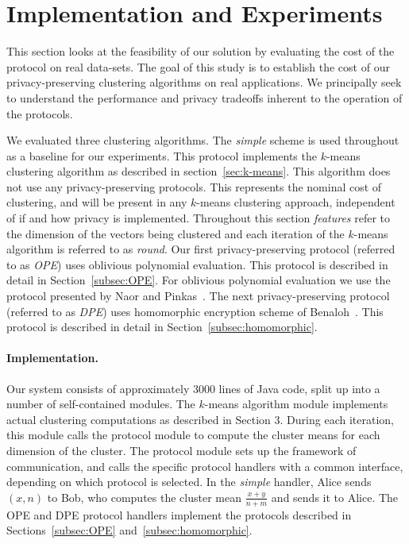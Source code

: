 \section{Implementation and Experiments}
\label{sec:eval}

This section looks at the feasibility of our solution by evaluating
the cost of the protocol on real data-sets.  The goal of this study is
to establish the cost of our privacy-preserving clustering algorithms
on real applications. We principally seek to understand the
performance and privacy tradeoffs inherent to the operation of the
protocols.

We evaluated three clustering algorithms. The {\it simple} scheme is
used throughout as a baseline for our experiments.  This protocol
implements the $k$-means clustering algorithm as described in
section~\ref{sec:k-means}.  This algorithm does not use any
privacy-preserving protocols.  This represents the nominal cost of
clustering, and will be present in any $k$-means clustering approach,
independent of if and how privacy is implemented.  Throughout this
section {\it features} refer to the dimension of the vectors being
clustered and each iteration of the $k$-means algorithm is referred to
as {\it round}.  Our first privacy-preserving protocol (referred to as
{\it OPE}) uses oblivious polynomial evaluation. This protocol is
described in detail in Section~\ref{subsec:OPE}.  For oblivious
polynomial evaluation we use the protocol presented by Naor and
Pinkas~\cite{NaorPinkas99}. The next privacy-preserving protocol
(referred to as {\it DPE}) uses homomorphic encryption scheme of
Benaloh~\cite{Benaloh:94}. This protocol is described in detail in
Section~\ref{subsec:homomorphic}.  

\paragraph{Implementation.}
Our system consists of approximately $3000$ lines of Java code, split
up into a number of self-contained modules.  The $k$-means algorithm
module implements actual clustering computations as described in
Section 3.  During each iteration, this module calls the {\small\sf
protocol} module to compute the cluster means for each dimension of
the cluster.  The {\small\sf protocol} module sets up the framework of
communication, and calls the specific protocol handlers with a common
interface, depending on which protocol is selected. In the {\it
simple} handler, Alice sends $(x,n)$ to Bob, who computes the cluster
mean $\frac{x+y}{n+m}$ and sends it to Alice.  The OPE and DPE
protocol handlers implement the protocols described in
Sections~\ref{subsec:OPE} and~\ref{subsec:homomorphic}.

